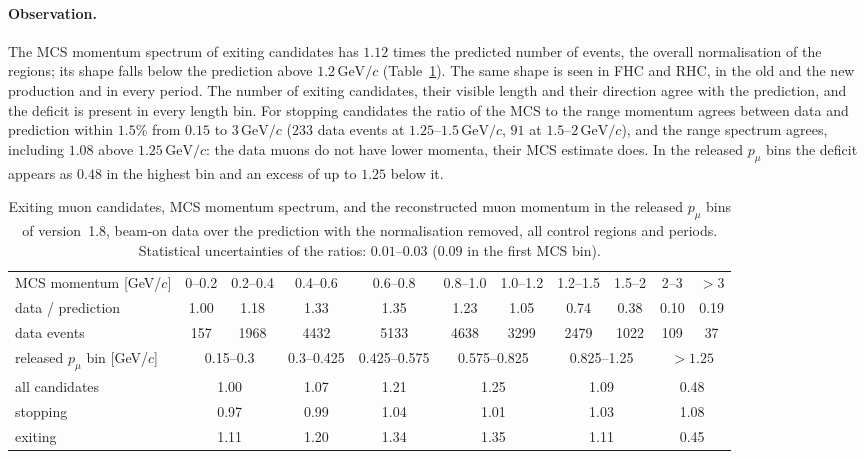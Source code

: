 \documentclass[11pt,a4paper]{article}
\newcommand{\GeVc}{\,\text{GeV}\!/c}
\begin{document}
\paragraph{Observation.} The MCS momentum spectrum of exiting candidates has $1.12$ times the predicted number of
events, the overall normalisation of the regions; its shape falls below the prediction above $1.2\GeVc$
(Table~\ref{tab:mcs_cr_obs}). The same shape is seen in FHC and RHC, in the old and the new production and in every
period. The number of exiting candidates, their visible length and their direction agree with the prediction, and the
deficit is present in every length bin. For stopping candidates the ratio of the MCS to the range momentum agrees
between data and prediction within $1.5\%$ from $0.15$ to $3\GeVc$ ($233$ data events at $1.25$--$1.5\GeVc$, $91$ at
$1.5$--$2\GeVc$), and the range spectrum agrees, including $1.08$ above $1.25\GeVc$: the data muons do not have lower
momenta, their MCS estimate does. In the released $p_\mu$ bins the deficit appears as $0.48$ in the highest bin and an
excess of up to $1.25$ below it.

\begin{table}[H]
  \centering\footnotesize\setlength{\tabcolsep}{3pt}
  \begin{tabular}{lcccccccccc}
    \toprule
    MCS momentum [GeV/$c$] & 0--0.2 & 0.2--0.4 & 0.4--0.6 & 0.6--0.8 & 0.8--1.0 & 1.0--1.2 & 1.2--1.5 & 1.5--2 & 2--3 & $>3$ \\
    data / prediction & 1.00 & 1.18 & 1.33 & 1.35 & 1.23 & 1.05 & 0.74 & 0.38 & 0.10 & 0.19 \\
    data events & 157 & 1968 & 4432 & 5133 & 4638 & 3299 & 2479 & 1022 & 109 & 37 \\
    \midrule
    released $p_\mu$ bin [GeV/$c$] & \multicolumn{2}{c}{0.15--0.3} & 0.3--0.425 & 0.425--0.575 & \multicolumn{2}{c}{0.575--0.825} & \multicolumn{2}{c}{0.825--1.25} & \multicolumn{2}{c}{$>1.25$} \\
    all candidates & \multicolumn{2}{c}{1.00} & 1.07 & 1.21 & \multicolumn{2}{c}{1.25} & \multicolumn{2}{c}{1.09} & \multicolumn{2}{c}{0.48} \\
    stopping & \multicolumn{2}{c}{0.97} & 0.99 & 1.04 & \multicolumn{2}{c}{1.01} & \multicolumn{2}{c}{1.03} & \multicolumn{2}{c}{1.08} \\
    exiting & \multicolumn{2}{c}{1.11} & 1.20 & 1.34 & \multicolumn{2}{c}{1.35} & \multicolumn{2}{c}{1.11} & \multicolumn{2}{c}{0.45} \\
    \bottomrule
  \end{tabular}
  \caption{Exiting muon candidates, MCS momentum spectrum, and the reconstructed muon momentum in the released $p_\mu$
    bins of version~1.8, beam-on data over the prediction with the normalisation removed, all control regions and
    periods. Statistical uncertainties of the ratios: $0.01$--$0.03$ ($0.09$ in the first MCS bin).}
  \label{tab:mcs_cr_obs}
\end{table}
\end{document}
